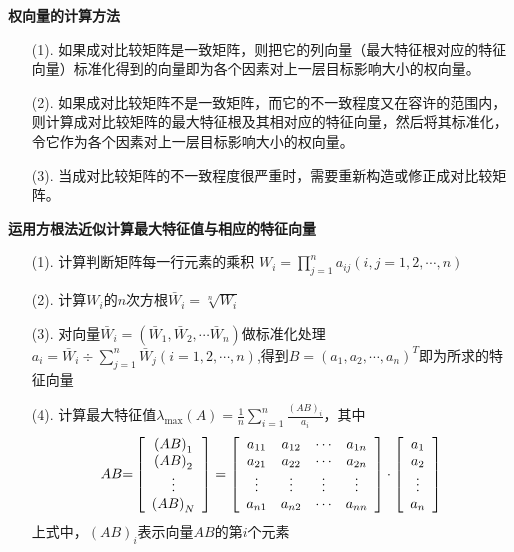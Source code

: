 \documentclass[openany]{progbookcn}
\begin{document}
\noindent \textbf{权向量的计算方法}
\begin{enumerate}
\item [(1).]如果成对比较矩阵是一致矩阵，则把它的列向量（最大特征根对应的特征向量）标准化得到的向量即为各个因素对上一层目标影响大小的权向量。
\item [(2).]如果成对比较矩阵不是一致矩阵，而它的不一致程度又在容许的范围内，则计算成对比较矩阵的最大特征根及其相对应的特征向量，然后将其标准化，令它作为各个因素对上一层目标影响大小的权向量。
\item [(3).]当成对比较矩阵的不一致程度很严重时，需要重新构造或修正成对比较矩阵。
\end{enumerate}
\noindent \textbf{运用方根法近似计算最大特征值与相应的特征向量}
\begin{enumerate}
\item[(1).] 计算判断矩阵每一行元素的乘积 ${W_i} = \prod\limits_{j = 1}^n {{a_{ij}}(i,j = 1,2, \cdots ,n)}$
\item[(2).]计算$W_i$的$n$次方根${\bar W_i} = \sqrt[n]{{{W_i}}}$
\item[(3).] 对向量${\bar W_i} = ({\bar W_1},{\bar W_2}, \cdots {\bar W_n})$做标准化处理${a_i} = {\bar W_i} \div \sum\limits_{j = 1}^n {{{\bar W}_j}(i = 1,2, \cdots ,n)}$,得到${B=(a_1,a_2,\cdots,a_n)^T}$即为所求的特征向量
\item[(4).] 计算最大特征值${\lambda _{\max }}(A) = \frac{1}{n}\sum\limits_{i = 1}^n {\frac{{{{(AB)}_i}}}{{{a_i}}}}$，其中
\begin{equation}\nonumber
AB{\rm{ = }}\left[ {\begin{array}{*{20}{c}}
{{{(AB)}_1}}\\
{{{(AB)}_2}}\\
 \vdots \\
{{{(AB)}_N}}
\end{array}} \right] = \left[ {\begin{array}{*{20}{c}}
{{a_{{\rm{11}}}}}&{{a_{12}}}& \cdots &{{a_{1n}}}\\
{{a_{21}}}&{{a_{22}}}& \cdots &{{a_{2n}}}\\
 \vdots & \vdots & \vdots & \vdots \\
{{a_{n1}}}&{{a_{n2}}}& \cdots &{{a_{nn}}}
\end{array}} \right] \cdot \left[ {\begin{array}{*{20}{c}}
{{a_1}}\\
{{a_2}}\\
 \vdots \\
{{a_n}}
\end{array}} \right]
\end{equation}
上式中，$(AB)_i$表示向量$AB$的第$i$个元素
\end{enumerate}
\end{document}
